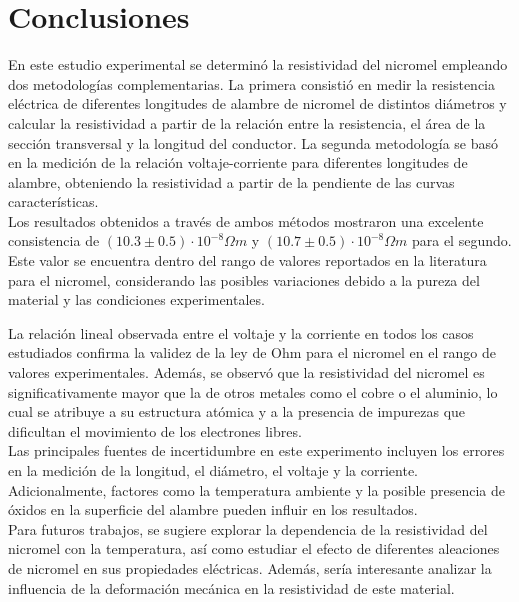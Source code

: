 \documentclass[article,12pt]{elsarticle}
\begin{document}
\section{Conclusiones}
En este estudio experimental se determinó la resistividad del nicromel empleando dos metodologías complementarias. La primera consistió en medir la resistencia eléctrica de diferentes longitudes de alambre de nicromel de distintos diámetros y calcular la resistividad a partir de la relación entre la resistencia, el área de la sección transversal y la longitud del conductor. La segunda metodología se basó en la medición de la relación voltaje-corriente para diferentes longitudes de alambre, obteniendo la resistividad a partir de la pendiente de las curvas características.\\

Los resultados obtenidos a través de ambos métodos mostraron una excelente consistencia de $(10.3 \pm 0.5) \cdot 10^{-8} \Omega m$ y $(10.7 \pm 0.5) \cdot 10^{-8} \Omega m$ para el segundo. Este valor se encuentra dentro del rango de valores reportados en la literatura para el nicromel, considerando las posibles variaciones debido a la pureza del material y las condiciones experimentales.

\newpage
La relación lineal observada entre el voltaje y la corriente en todos los casos estudiados confirma la validez de la ley de Ohm para el nicromel en el rango de valores experimentales. Además, se observó que la resistividad del nicromel es significativamente mayor que la de otros metales como el cobre o el aluminio, lo cual se atribuye a su estructura atómica y a la presencia de impurezas que dificultan el movimiento de los electrones libres.\\

Las principales fuentes de incertidumbre en este experimento incluyen los errores en la medición de la longitud, el diámetro, el voltaje y la corriente. Adicionalmente, factores como la temperatura ambiente y la posible presencia de óxidos en la superficie del alambre pueden influir en los resultados.\\

Para futuros trabajos, se sugiere explorar la dependencia de la resistividad del nicromel con la temperatura, así como estudiar el efecto de diferentes aleaciones de nicromel en sus propiedades eléctricas. Además, sería interesante analizar la influencia de la deformación mecánica en la resistividad de este material.\\\\
\end{document}
